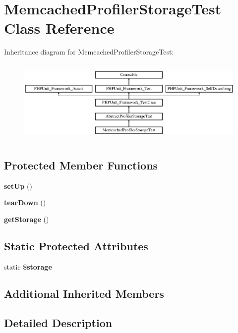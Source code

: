 \section{Memcached\+Profiler\+Storage\+Test Class Reference}
\label{class_symfony_1_1_component_1_1_http_kernel_1_1_tests_1_1_profiler_1_1_memcached_profiler_storage_test}
Inheritance diagram for Memcached\+Profiler\+Storage\+Test\+:\begin{figure}[H]
\begin{center}
\leavevmode
\includegraphics[height=4.129793cm]{class_symfony_1_1_component_1_1_http_kernel_1_1_tests_1_1_profiler_1_1_memcached_profiler_storage_test}
\end{center}
\end{figure}
\subsection*{Protected Member Functions}
\begin{DoxyCompactItemize}
\item 
{\bf set\+Up} ()
\item 
{\bf tear\+Down} ()
\item 
{\bf get\+Storage} ()
\end{DoxyCompactItemize}
\subsection*{Static Protected Attributes}
\begin{DoxyCompactItemize}
\item 
static {\bf \$storage}
\end{DoxyCompactItemize}
\subsection*{Additional Inherited Members}


\subsection{Detailed Description}


